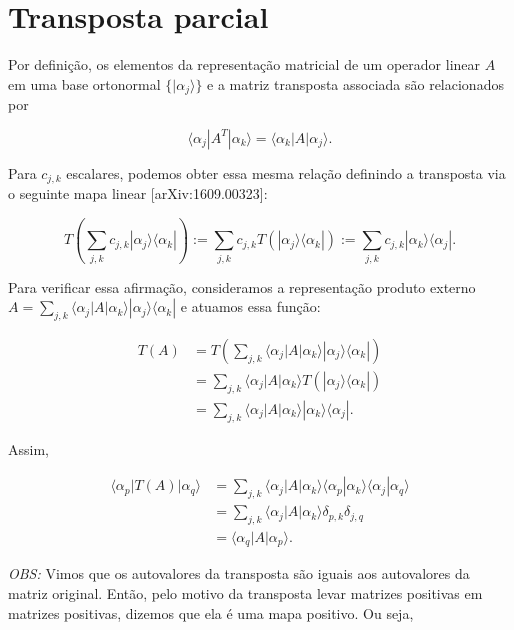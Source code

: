 \documentclass[11pt]{article}
\begin{document}
    \section{Transposta parcial}\label{transposta-parcial}

Por definição, os elementos da representação matricial de um operador
linear \(A\) em uma base ortonormal \(\{|\alpha_{j}\rangle\}\) e a
matriz transposta associada são relacionados por

\begin{equation}
\langle\alpha_{j}|A^{T}|\alpha_{k}\rangle = \langle\alpha_{k}|A|\alpha_{j}\rangle.
\end{equation}

Para \(c_{j,k}\) escalares, podemos obter essa mesma relação definindo a
transposta via o seguinte mapa linear {[}arXiv:1609.00323{]}:

\begin{equation}
T(\sum_{j,k}c_{j,k}|\alpha_{j}\rangle\langle\alpha_{k}|):=\sum_{j,k}c_{j,k}T(|\alpha_{j}\rangle\langle\alpha_{k}|):=\sum_{j,k}c_{j,k}|\alpha_{k}\rangle\langle\alpha_{j}|.
\end{equation}

Para verificar essa afirmação, consideramos a representação produto
externo
\(A=\sum_{j,k}\langle\alpha_{j}|A|\alpha_{k}\rangle|\alpha_{j}\rangle\langle\alpha_{k}|\)
e atuamos essa função:

\begin{align}
T(A) & = T(\sum_{j,k}\langle\alpha_{j}|A|\alpha_{k}\rangle|\alpha_{j}\rangle\langle\alpha_{k}|)  \\
& = \sum_{j,k}\langle\alpha_{j}|A|\alpha_{k}\rangle T(|\alpha_{j}\rangle\langle\alpha_{k}|)  \\
& = \sum_{j,k}\langle\alpha_{j}|A|\alpha_{k}\rangle |\alpha_{k}\rangle\langle\alpha_{j}|.
\end{align}

Assim,

\begin{align}
\langle\alpha_{p}|T(A)|\alpha_{q}\rangle & = \sum_{j,k}\langle\alpha_{j}|A|\alpha_{k}\rangle \langle\alpha_{p}|\alpha_{k}\rangle\langle\alpha_{j}|\alpha_{q}\rangle \\
& = \sum_{j,k}\langle\alpha_{j}|A|\alpha_{k}\rangle \delta_{p,k}\delta_{j,q} \\
& = \langle\alpha_{q}|A|\alpha_{p}\rangle.
\end{align}

\emph{OBS:} Vimos que os autovalores da transposta são iguais aos
autovalores da matriz original. Então, pelo motivo da transposta levar
matrizes positivas em matrizes positivas, dizemos que ela é uma mapa
positivo. Ou seja,
\end{document}
